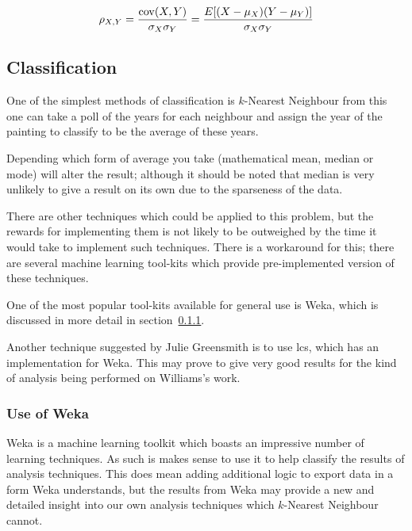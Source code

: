 \begin{equation}\label{eq:pearsons}
\rho_{X,Y}={\mathrm{cov}(X,Y) \over \sigma_X \sigma_Y} ={E[(X-\mu_X)(Y-\mu_Y)] \over \sigma_X\sigma_Y}
\end{equation}


\subsection{Classification}
One of the simplest methods of classification is $k$-Nearest Neighbour from
this one can take a poll of the years for each neighbour and assign the year of the painting to
classify to be the average of these years.

Depending which form of average you take (mathematical mean, median or mode) will
alter the result; although it should be noted that median is very unlikely to give a result on its
own due to the sparseness of the data.

There are other techniques which could be applied to this problem, but the rewards for 
implementing them is not likely to be outweighed by the time it would take to implement such
techniques. There is a workaround for this; there are several machine learning tool-kits which 
provide pre-implemented version of these techniques.

One of the most popular tool-kits available for general use is Weka\cite{Hall2009WEKA}, which is discussed in more
detail in section~\ref{sec:bg-weka}.

Another technique suggested by Julie Greensmith is to use \gls{lcs}\cite{Bacardit2013Largescale}, 
which has an implementation for Weka. This may prove to give very good results for the kind of
analysis being performed on Williams's work.

\subsubsection{Use of Weka}\label{sec:bg-weka}
Weka is a machine learning toolkit which boasts an impressive number of learning techniques. As
such is makes sense to use it to help classify the results of analysis techniques. This does mean
adding additional logic to export data in a form Weka understands, but the results from Weka
may provide a new and detailed insight into our own analysis techniques which $k$-Nearest 
Neighbour cannot.



